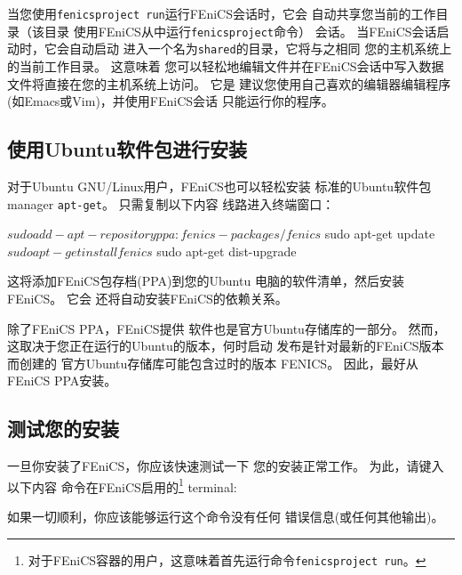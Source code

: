 \begin{notice}[与FEniCS容器共享文件]
当您使用\texttt{fenicsproject run}运行FEniCS会话时，它会
自动共享您当前的工作目录（该目录
使用FEniCS从中运行\texttt{fenicsproject}命令）
会话。 当FEniCS会话启动时，它会自动启动
进入一个名为\texttt{shared}的目录，它将与之相同
您的主机系统上的当前工作目录。 这意味着
您可以轻松地编辑文件并在FEniCS会话中写入数据
文件将直接在您的主机系统上访问。 它是
建议您使用自己喜欢的编辑器编辑程序
(如Emacs或Vim)，并使用FEniCS会话
只能运行你的程序。
\end{notice}


\subsection{使用Ubuntu软件包进行安装}
对于Ubuntu GNU/Linux用户，FEniCS也可以轻松安装
标准的Ubuntu软件包manager \texttt{apt-get}。 只需复制以下内容
线路进入终端窗口：


\begin{bash}
$ sudo add-apt-repository ppa:fenics-packages/fenics
$ sudo apt-get update
$ sudo apt-get install fenics
$ sudo apt-get dist-upgrade
\end{bash}

这将添加FEniCS包存档(PPA)到您的Ubuntu
电脑的软件清单，然后安装FEniCS。 它会
还将自动安装FEniCS的依赖关系。

\begin{notice}[注意旧包装！]
除了FEniCS PPA，FEniCS提供
软件也是官方Ubuntu存储库的一部分。 然而，
这取决于您正在运行的Ubuntu的版本，何时启动
发布是针对最新的FEniCS版本而创建的
官方Ubuntu存储库可能包含过时的版本
FENICS。 因此，最好从FEniCS PPA安装。
\end{notice}

\subsection{测试您的安装}
一旦你安装了FEniCS，你应该快速测试一下
您的安装正常工作。 为此，请键入以下内容
命令在FEniCS启用的\footnote{对于FEniCS容器的用户，这意味着首先运行命令\texttt{fenicsproject run}。} terminal:


如果一切顺利，你应该能够运行这个命令没有任何
错误信息(或任何其他输出)。

